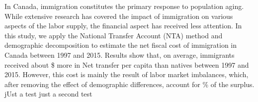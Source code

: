 In Canada, immigration constitutes the primary response to population aging. While extensive research has covered the impact of immigration on various aspects of the labor supply, the financial aspect has received less attention.
In this study, we apply the National Transfer Account (NTA) method and demographic decomposition to estimate the net fiscal cost of immigration in Canada between 1997 and 2015.
Results show that, on average, immigrants received about \$ more in Net transfer per capita than natives between 1997 and 2015.
However, this cost is mainly the result of labor market imbalances, which, after removing the effect of demographic differences, account for \% of the surplus.
jUst a test
just a second test